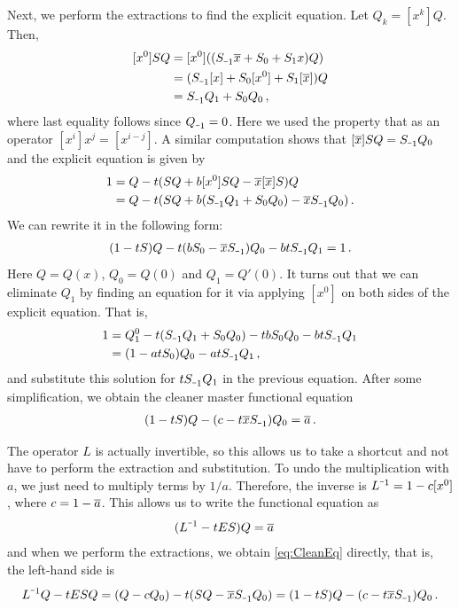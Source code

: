 Next, we perform the extractions to find the explicit equation. Let $Q_k = [x^k]Q$. Then,
\begin{align}
	\begin{split}
		[x^0] SQ &= [x^0]((S_{\um 1}\ol x + S_0 + S_1 x)Q) \\
		& = (S_{\um 1}[x]+ S_0[x^0] + S_1 [\ol x])Q\\
		& = S_{\um 1}Q_1 + S_0 Q_0\,,
	\end{split}
\end{align}
where last equality follows since $Q_{\um 1}= 0$. Here we used the property that as an operator $[x^i]x^j = [x^{i-j}]$. A similar computation shows that $[\ol x]SQ = S_{\um 1} Q_0$ and the explicit equation is given by
\begin{align}
	\begin{split}
		1 &= Q - t(SQ + b[x^0]SQ - \ext{\ol x}S)Q\\
		&= Q - t(SQ + b(S_{\um 1}Q_1 + S_0Q_0) - \ol xS_{\um 1}Q_0)\,.
	\end{split}
\end{align}
We can rewrite it in the following form:
\begin{align}
	(1-t S)Q - t(bS_0-\ol xS_{\um 1})Q_0 -bt S_{\um 1}Q_1 = 1\,.
\end{align}
Here $Q = Q(x)$, $Q_0 = Q(0)$ and $Q_1 = Q'(0)$. It turns out that we can eliminate $Q_1$ by finding an equation for it via applying $[x^0]$ on both sides of the explicit equation. That is,
\begin{align}
	\begin{split}
		1 &= Q_1^0 - t(S_{\um 1}Q_1 + S_0 Q_0) - tbS_0Q_0 - bt S_{\um 1}Q_1\\
		 &=(1-at S_0)Q_0-at S_{\um 1}Q_1\,,
	\end{split}
\end{align}
and substitute this solution for $tS_{\um 1}Q_1$ in the previous equation. After some simplification, we obtain the cleaner master functional equation
\begin{align}
\label{eq:CleanEq}
	(1-t S)Q - (c -t\ol xS_{\um 1})Q_0 = \ol a\,.
\end{align}

The operator $L$ is actually invertible, so this allows us to take a shortcut and not have to perform the extraction and substitution. To undo the multiplication with $a$, we just need to multiply terms by $1/a$. Therefore, the inverse is $L^{\um 1} = 1 - c[x^0]$, where $c = 1-\overline{a}$. This allows us to write the functional equation as
\begin{align}
	(L^{\um 1}-t ES)Q &= \ol a
\end{align}
and when we perform the extractions, we obtain \autoref{eq:CleanEq} directly, that is, the left-hand side is
\begin{align}
	 L^{\um 1}Q - t ESQ= (Q-cQ_0) - t(SQ - \ol xS_{\um 1}Q_0) = (1-t S)Q - (c-t\ol xS_{\um 1})Q_0\,. 
\end{align}

